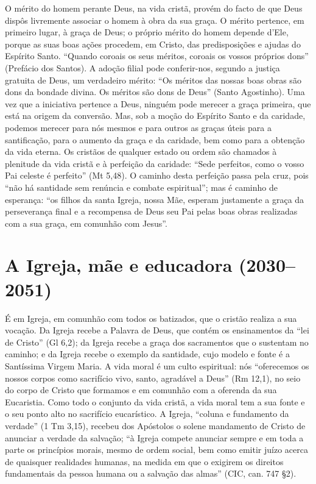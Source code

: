 O mérito do homem perante Deus, na vida cristã, provém do facto de que Deus dispôs livremente associar o homem à obra da sua graça. O mérito pertence, em primeiro lugar, à graça de Deus; o próprio mérito do homem depende d'Ele, porque as suas boas ações procedem, em Cristo, das predisposições e ajudas do Espírito Santo. ``Quando coroais os seus méritos, coroais os vossos próprios dons'' (Prefácio dos Santos). A adoção filial pode conferir-nos, segundo a justiça gratuita de Deus, um verdadeiro mérito: ``Os méritos das nossas boas obras são dons da bondade divina. Os méritos são dons de Deus'' (Santo Agostinho). Uma vez que a iniciativa pertence a Deus, ninguém pode merecer a graça primeira, que está na origem da conversão. Mas, sob a moção do Espírito Santo e da caridade, podemos merecer para nós mesmos e para outros as graças úteis para a santificação, para o aumento da graça e da caridade, bem como para a obtenção da vida eterna. Os cristãos de qualquer estado ou ordem são chamados à plenitude da vida cristã e à perfeição da caridade: ``Sede perfeitos, como o vosso Pai celeste é perfeito'' (Mt 5,48). O caminho desta perfeição passa pela cruz, pois ``não há santidade sem renúncia e combate espiritual''; mas é caminho de esperança: ``os filhos da santa Igreja, nossa Mãe, esperam justamente a graça da perseverança final e a recompensa de Deus seu Pai pelas boas obras realizadas com a sua graça, em comunhão com Jesus''.

\section{A Igreja, mãe e educadora (2030--2051)}

É em Igreja, em comunhão com todos os batizados, que o cristão realiza a sua vocação. Da Igreja recebe a Palavra de Deus, que contém os ensinamentos da ``lei de Cristo'' (Gl 6,2); da Igreja recebe a graça dos sacramentos que o sustentam no caminho; e da Igreja recebe o exemplo da santidade, cujo modelo e fonte é a Santíssima Virgem Maria. A vida moral é um culto espiritual: nós ``oferecemos os nossos corpos como sacrifício vivo, santo, agradável a Deus'' (Rm 12,1), no seio do corpo de Cristo que formamos e em comunhão com a oferenda da sua Eucaristia. Como todo o conjunto da vida cristã, a vida moral tem a sua fonte e o seu ponto alto no sacrifício eucarístico. A Igreja, ``coluna e fundamento da verdade'' (1 Tm 3,15), recebeu dos Apóstolos o solene mandamento de Cristo de anunciar a verdade da salvação; ``à Igreja compete anunciar sempre e em toda a parte os princípios morais, mesmo de ordem social, bem como emitir juízo acerca de quaisquer realidades humanas, na medida em que o exigirem os direitos fundamentais da pessoa humana ou a salvação das almas'' (CIC, can. 747 §2).

